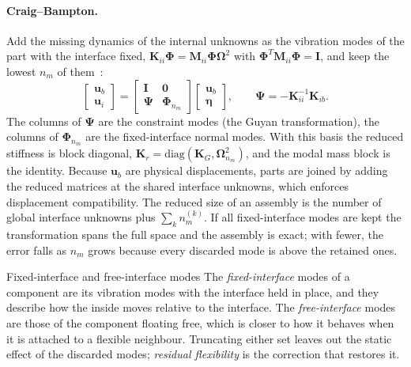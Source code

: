 \paragraph{Craig--Bampton.}
Add the missing dynamics of the internal unknowns as the vibration modes of the part with the interface fixed, $\bm K_{ii}\bm\Phi=\bm M_{ii}\bm\Phi\bm\Omega^2$ with $\bm\Phi^T\bm M_{ii}\bm\Phi=\bm I$, and keep the lowest $n_m$ of them~\cite{hurty1965,craig1968}:
\begin{equation}\label{eq:cm-cb}
\begin{bmatrix}\bm u_b\\\bm u_i\end{bmatrix}=\begin{bmatrix}\bm I&\bm 0\\\bm\Psi&\bm\Phi_{n_m}\end{bmatrix}\begin{bmatrix}\bm u_b\\\bm\eta\end{bmatrix},\qquad \bm\Psi=-\bm K_{ii}^{-1}\bm K_{ib}.
\end{equation}
The columns of $\bm\Psi$ are the constraint modes (the Guyan transformation), the columns of $\bm\Phi_{n_m}$ are the fixed-interface normal modes. With this basis the reduced stiffness is block diagonal, $\bm K_r=\mathrm{diag}(\bm K_G,\bm\Omega^2_{n_m})$, and the modal mass block is the identity. Because $\bm u_b$ are physical displacements, parts are joined by adding the reduced matrices at the shared interface unknowns, which enforces displacement compatibility. The reduced size of an assembly is the number of global interface unknowns plus $\sum_k n_m^{(k)}$. If all fixed-interface modes are kept the transformation spans the full space and the assembly is exact; with fewer, the error falls as $n_m$ grows because every discarded mode is above the retained ones.

\begin{sidenote}{Fixed-interface and free-interface modes}
The \emph{fixed-interface} modes of a component are its vibration modes with the interface held in place, and they describe how the inside moves relative to the interface. The \emph{free-interface} modes are those of the component floating free, which is closer to how it behaves when it is attached to a flexible neighbour. Truncating either set leaves out the static effect of the discarded modes; \emph{residual flexibility} is the correction that restores it.
\end{sidenote}

